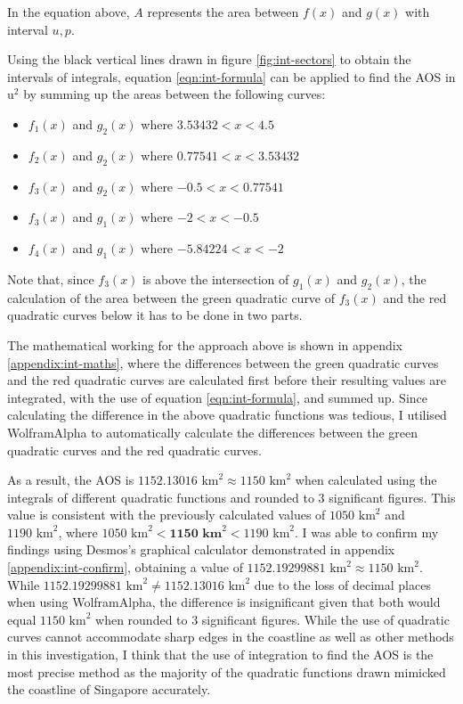 \documentclass[12pt]{article}
\begin{document}
In the equation above, $A$ represents the area between $f(x)$ and $g(x)$ with interval $u,p$.\newline

Using the black vertical lines drawn in figure \ref{fig:int-sectors} to obtain the intervals of integrals, equation \ref{eqn:int-formula} can be applied to find the AOS in u$^2$ by summing up the areas between the following curves:

\begin{itemize}
    \item $f_1(x)$ and $g_2(x)$ where $3.53432<x<4.5$
    \item $f_2(x)$ and $g_2(x)$ where $0.77541<x<3.53432$
    \item $f_3(x)$ and $g_2(x)$ where $-0.5<x<0.77541$
    \item $f_3(x)$ and $g_1(x)$ where $-2<x<-0.5$
    \item $f_4(x)$ and $g_1(x)$ where $-5.84224<x<-2$
\end{itemize}

Note that, since $f_3(x)$ is above the intersection of $g_1(x)$ and $g_2(x)$, the calculation of the area between the green quadratic curve of $f_3(x)$ and the red quadratic curves below it has to be done in two parts.\newline

The mathematical working for the approach above is shown in appendix \ref{appendix:int-maths}, where the differences between the green quadratic curves and the red quadratic curves are calculated first before their resulting values are integrated, with the use of equation \ref{eqn:int-formula}, and summed up. Since calculating the difference in the above quadratic functions was tedious, I utilised WolframAlpha to automatically calculate the differences between the green quadratic curves and the red quadratic curves.\newline

As a result, the AOS is $1152.13016\text{ km}^2\approx1150\text{ km}^2$ when calculated using the integrals of different quadratic functions and rounded to 3 significant figures. This value is consistent with the previously calculated values of $1050\text{ km}^2$ and $1190\text{ km}^2$, where $1050\text{ km}^2<\textbf{1150 km}^2<1190\text{ km}^2$. I was able to confirm my findings using Desmos's graphical calculator demonstrated in appendix \ref{appendix:int-confirm}, obtaining a value of $1152.19299881\text{ km}^2\approx1150\text{ km}^2$. While $1152.19299881\text{ km}^2\neq1152.13016\text{ km}^2$ due to the loss of decimal places when using WolframAlpha, the difference is insignificant given that both would equal $1150 \text{ km}^2$ when rounded to 3 significant figures. While the use of quadratic curves cannot accommodate sharp edges in the coastline as well as other methods in this investigation, I think that the use of integration to find the AOS is the most precise method as the majority of the quadratic functions drawn mimicked the coastline of Singapore accurately.\newline
\end{document}
